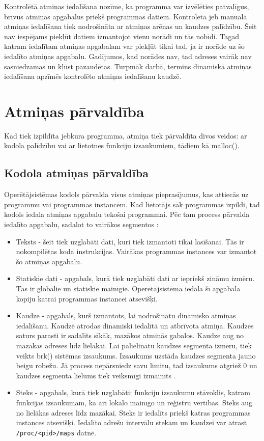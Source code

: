 Kontrolētā atmiņas iedalīšana nozīme, ka programma var izvēlēties patvaļīgus, brīvus atmiņas apgabalus priekš programmas datiem. 
Kontrolētā jeb manuālā atmiņas iedalīšana tiek nodrošināta ar atmiņas arēnas un kaudzes palīdzību. 
Šeit nav iespējams piekļūt datiem izmantojot vienu norādi un tās nobīdi. 
Tagad katram iedalītam atmiņas apgabalam var piekļūt tikai tad, ja ir norāde uz šo iedalīto atmiņas apgabalu. 
Gadījumos, kad norādes nav, tad adreses vairāk nav sasniedzamas un kļūst pazaudētas.
Turpmāk darbā, termins dinamiskā atmiņas iedalīšana apzīmēs kontrolēto atmiņas iedalīšanu kaudzē.


\section{Atmiņas pārvaldība}
Kad tiek izpildīta jebkura programma, atmiņa tiek pārvaldīta divos veidos: ar kodola palīdzību vai ar lietotnes funkciju izsaukumiem, tādiem kā malloc().

\subsection{Kodola atmiņas pārvaldība}
Operētājsistēmas kodols pārvalda  visus atmiņas pieprasījumus, kas attiecās uz programmu vai programmas instancēm.
Kad lietotājs sāk programmas izpildi, tad kodols iedala atmiņas apgabalu tekošai programmai.
Pēc tam process pārvalda iedalīto apgabalu, sadalot to vairākos segmentos  \cite {atparv}: 
\begin{itemize}
	\item   Teksts - šeit tiek uzglabāti dati, kuri tiek izmantoti tikai lasīšanai. Tās ir nokompilētas koda instrukcijas. 
    Vairākas programmas instances var izmantot šo atmiņas apgabalu.
    \item Statiskie dati - apgabals, kurā tiek uzglabāti dati ar iepriekš zināmu izmēru. Tās ir globālie un statiskie mainīgie.
    Operētājsistēma iedala šī apgabala kopiju katrai programmas instancei atsevišķi.
    \item Kaudze - apgabals, kurš izmantots, lai nodrošinātu dinamisko atmiņas iedalīšanu.
    Kaudzē atrodas dinamiski iedalītā un atbrīvota atmiņa. Kaudzes saturs parasti ir sadalīts sīkāk, mazākos atmiņās gabalos.
    Kaudze aug no mazākas adreses līdz lielākai.  Lai palielinātu kaudzes segmenta izmēru, tiek veikts brk() sistēmas izsaukums. 
    Izsaukums uzstāda kaudzes segmenta jauno beigu robežu. 
 Jā process nepārsniedz savu limitu, tad izsaukums atgriež 0 un kaudzes segmenta lielums tiek veiksmīgi izmainīts \cite{LINMAN}.
    \item Steks - apgabals, kurā tiek uzglabāti: funkciju izsaukumu stāvoklis, katram funkcijas izsaukumam, ka arī lokālo mainīgo un reģistru vērtības. 
    Steks aug no lielākas adreses līdz mazākai. 
    Steks ir iedalīts priekš katras programmas instances atsevišķi.
     Iedalīto adrešu intervālu stekam un kaudzei var atrast \texttt{/proc/<pid>/maps} datnē.
\end{itemize} 



